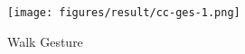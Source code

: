 \begin{figure}
	[h] \centering 
	\texttt{[image: figures/result/cc-ges-1.png]} \caption{Walk Gesture} \label{fg:cc:ges:1} 
\end{figure}
